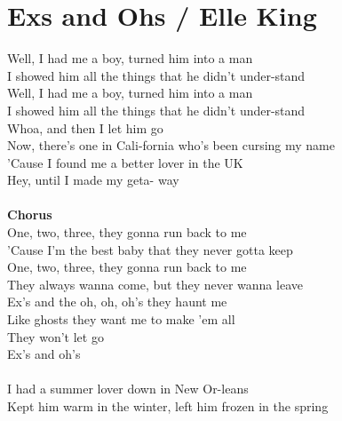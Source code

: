 \section{Exs and Ohs / Elle King}\label{sec:exsandohs}
\Dminor
\Amajor
\Fmajor
\Cmajor
\Gmajor
\BflatMajor

Well,  I had me a  boy, turned him  into a  man\\
I  showed him all the  things that he  didn't under-stand\\
Well,  I had me a  boy, turned him  into a  man\\
I  showed him all the  things that he  didn't under-stand\\
 Whoa, and then I let him  go   \\
Now, there's  one in Cali-fornia who's been  cursing my  name\\
'Cause  I found me a  better lover  in the  UK\\
 Hey, until I made my geta- way   \\
\\
\textbf{Chorus}\\
 One, two, three, they gonna run back to me\\
 'Cause I'm the best baby that they never gotta keep\\
 One, two, three, they gonna run back to me\\
They  always wanna come, but they never wanna leave\\
 Ex's and the  oh, oh, oh's they  haunt me\\
Like  ghosts they  want me to make 'em  all\\
They  won't let  go\\
Ex's and  oh's       \\
\\
I  had a summer  lover down in  New Or-leans\\
Kept him  warm in the  winter, left him  frozen in the  spring\\
